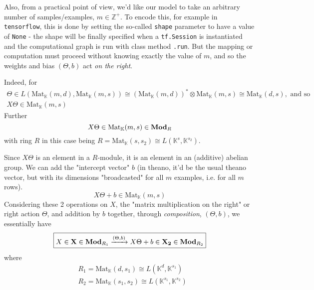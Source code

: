 \documentclass[10pt]{amsart}
\begin{document}
Also, from a practical point of view, we'd like our model to take an arbitrary number of samples/examples, $m \in \mathbb{Z}^+$.  To encode this, for example in \verb|tensorflow|, this is done by setting the so-called \verb|shape| parameter to have a value of \verb|None| - the shape will be finally specified when a \verb|tf.Session| is instantiated and the computational graph is run with class method \verb|.run|.  But the mapping or computation must proceed without knowing exactly the value of $m$, and so the weights and bias $(\Theta,b)$ act \emph{on the right}.  

Indeed, for
\[
\begin{gathered}
	\Theta \in L( \text{Mat}_{\mathbb{K}}(m,d), \text{Mat}_{\mathbb{K}}(m,s) ) \cong    (\text{Mat}_{\mathbb{K}}(m,d))^* \otimes \text{Mat}_{\mathbb{K}}(m,s) \cong \text{Mat}_{\mathbb{K}}(d,s), \text{ and so } \\
X\Theta \in \text{Mat}_{\mathbb{K}}(m,s)
\end{gathered}
\]
Further
\[
X\Theta \in \text{Mat}_{\mathbb{K}}(m,s) \in \text{\textbf{Mod}}_R
\]
with ring $R$ in this case being $R=\text{Mat}_{\mathbb{K}}(s,s_2) \cong L(\mathbb{K}^s, \mathbb{K}^{s_2})$.  

Since $X\Theta$ is an element in a $R$-module, it is an element in an (additive) abelian group.  We can add the "intercept vector" $b$ (in theano, it'd be the usual theano vector, but with its dimensions "broadcasted" for all $m$ examples, i.e. for all $m$ rows).  
\[
X\Theta + b \in \text{Mat}_{\mathbb{K}}(m,s)
\]
Considering these 2 operations on $X$, the "matrix multiplication on the right" or right action $\Theta$, and addition by $b$ together, through \emph{composition}, $(\Theta,b)$, we essentially have
\begin{equation}
\boxed{ X\in \mathbf{X} \in \text{\textbf{Mod}}_{R_1} \xrightarrow{ (\Theta,b) } X\Theta + b \in \mathbf{X_2} \in \text{\textbf{Mod}}_{R_2}  }
\end{equation}
where
\[
\begin{aligned}
& R_1 = \text{Mat}_{\mathbb{K}}(d,s_1) \cong L(\mathbb{K}^d, \mathbb{K}^{s_1} ) \\ 
& R_2 = \text{Mat}_{\mathbb{K}}(s_1,s_2) \cong L(\mathbb{K}^{s_1}, \mathbb{K}^{s_2})
\end{aligned}
\]
\end{document}
